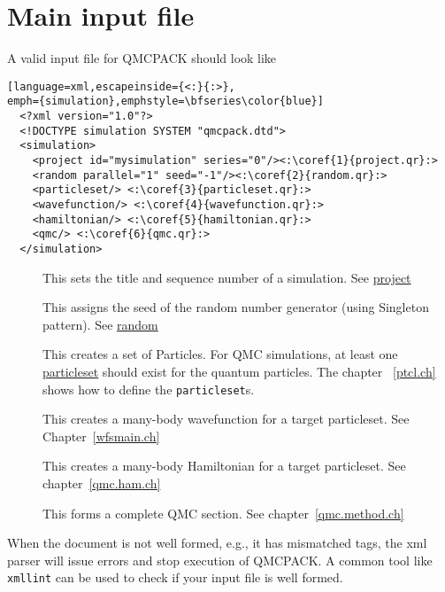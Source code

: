 \section{Main input file}\label{input.intro}

A valid input file for QMCPACK should look like

\begin{lstlisting}[language=xml,escapeinside={<:}{:>},
emph={simulation},emphstyle=\bfseries\color{blue}]
  <?xml version="1.0"?>
  <!DOCTYPE simulation SYSTEM "qmcpack.dtd">
  <simulation>
    <project id="mysimulation" series="0"/><:\coref{1}{project.qr}:>
    <random parallel="1" seed="-1"/><:\coref{2}{random.qr}:>
    <particleset/> <:\coref{3}{particleset.qr}:>
    <wavefunction/> <:\coref{4}{wavefunction.qr}:>
    <hamiltonian/> <:\coref{5}{hamiltonian.qr}:>
    <qmc/> <:\coref{6}{qmc.qr}:>
  </simulation> 
\end{lstlisting}
\begin{description}
\item[{\hyperref[project.qr]{}}]
This sets the title and sequence number of a simulation.  See
\hyperref[project.sec]{project} 
\item[{\hyperref[random.qr]{}}]
This assigns the seed of the random number generator (using Singleton pattern).
See \hyperref[random.sec]{random} 
\item[{\hyperref[particleset.qr]{}}]
This creates a set of Particles. For QMC simulations, at least one
\hyperref[particleset.sec]{particleset} should exist for the quantum particles.
The chapter ~\ref{ptcl.ch} shows how to define the \texttt{particleset}s. 
\item[{\hyperref[wavefunction.qr]{}}]
This creates a many-{}body wavefunction for a target particleset. See
Chapter~\ref{wfsmain.ch} 
\item[{\hyperref[hamiltonian.qr]{}}]
This creates a many-{}body Hamiltonian for a target particleset. See chapter~\ref{qmc.ham.ch} 
\item[{\hyperref[qmc.qr]{}}]
This forms a complete QMC section. See chapter~\ref{qmc.method.ch} 
\end{description}

When the document is not well formed, e.g., it has mismatched tags, the xml
parser will issue errors and stop execution of QMCPACK. A common tool like {\tt
xmllint} can be used to check if your input file is well formed.  



